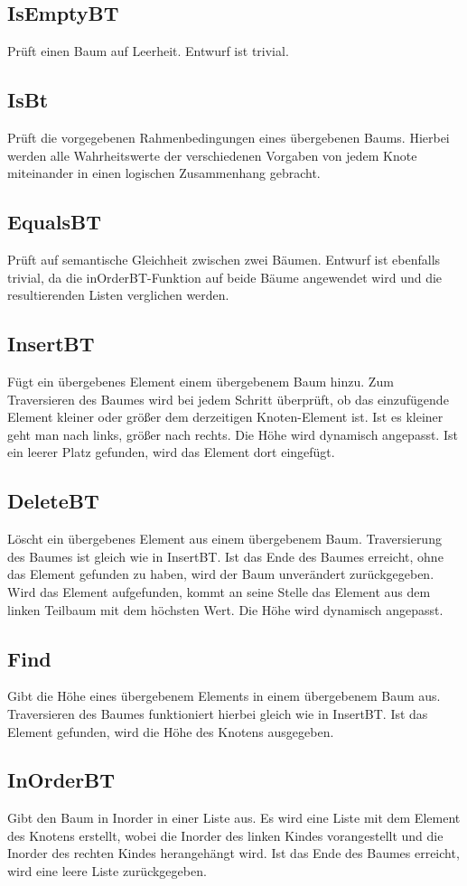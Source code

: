 \documentclass[11pt]{article}
\begin{document}
    \subsection{IsEmptyBT}
    Prüft einen Baum auf Leerheit. Entwurf ist trivial.
    \subsection{IsBt}
    Prüft die vorgegebenen Rahmenbedingungen eines übergebenen
    Baums. Hierbei werden alle Wahrheitswerte der verschiedenen
    Vorgaben von jedem Knote miteinander in einen logischen
    Zusammenhang gebracht.
    \subsection{EqualsBT}
    Prüft auf semantische Gleichheit zwischen zwei Bäumen.
    Entwurf ist ebenfalls trivial, da die inOrderBT-Funktion
    auf beide Bäume angewendet wird und die resultierenden Listen verglichen werden.
    \subsection{InsertBT}
    Fügt ein übergebenes Element einem übergebenem Baum hinzu. Zum Traversieren des Baumes wird bei jedem Schritt überprüft, ob das einzufügende Element kleiner oder größer dem derzeitigen Knoten-Element ist. Ist es kleiner geht man nach links, größer nach rechts. Die Höhe wird dynamisch angepasst. Ist ein leerer Platz gefunden, wird das Element dort eingefügt.
    \subsection{DeleteBT}
    Löscht ein übergebenes Element aus einem übergebenem Baum. Traversierung des Baumes ist gleich wie in InsertBT. Ist das Ende des Baumes erreicht, ohne das Element gefunden zu haben, wird der Baum unverändert zurückgegeben. Wird das Element aufgefunden, kommt an seine Stelle das Element aus dem linken Teilbaum mit dem höchsten Wert. Die Höhe wird dynamisch angepasst.
    \subsection{Find}
    Gibt die Höhe eines übergebenem Elements in einem übergebenem Baum aus. Traversieren des Baumes funktioniert hierbei gleich wie in InsertBT. Ist das Element gefunden, wird die Höhe des Knotens ausgegeben.
    \subsection{InOrderBT}
    Gibt den Baum in Inorder in einer Liste aus. Es wird eine Liste mit dem Element des Knotens erstellt, wobei die Inorder des linken Kindes vorangestellt und die Inorder des rechten Kindes herangehängt wird. Ist das Ende des Baumes erreicht, wird eine leere Liste zurückgegeben.
\end{document}
